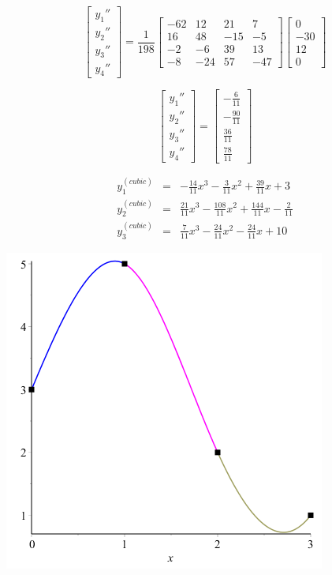 \documentclass[11pt]{article} %
\begin{document}
$$
\begin{bmatrix} y_1'' \\ y_2'' \\ y_3'' \\ y_4'' \end{bmatrix} = 
\frac{1}{198}\begin{bmatrix}-62 & 12 & 21 & 7 \\ 16 & 48 & -15 & -5 
		 \\  -2 & -6 & 39 & 13 \\ -8 & -24 & 57 & -47
\end{bmatrix}
\begin{bmatrix} 0 \\ -30 \\ 12 \\ 0\end{bmatrix}$$

$$
\begin{bmatrix} y_1'' \\ y_2'' \\ y_3'' \\ y_4'' \end{bmatrix} = 
\begin{bmatrix} -\frac{6}{11} \\ -\frac{90}{11} \\\frac{36}{11} \\ \frac{78}{11}\end{bmatrix}$$

$$\begin{array}{lclcl} y^{(cubic)}_1 & = &  -\frac{14}{11}x^3 - \frac{3}{11}x^2 + \frac{39}{11} x + 3  \\
		        y^{(cubic)}_2  & = & \frac{21}{11}x^3 - \frac{108}{11}x^2 + \frac{144}{11}x - \frac{2}{11} \\
		        y^{(cubic)}_3  & = & \frac{7}{11}x^3 - \frac{24}{11}x^2 - \frac{24}{11}x +10 
\end{array}$$

\begin{center}
\includegraphics[scale=.5]{plots/problem4plot5.png}
\end{center}
\end{document}
